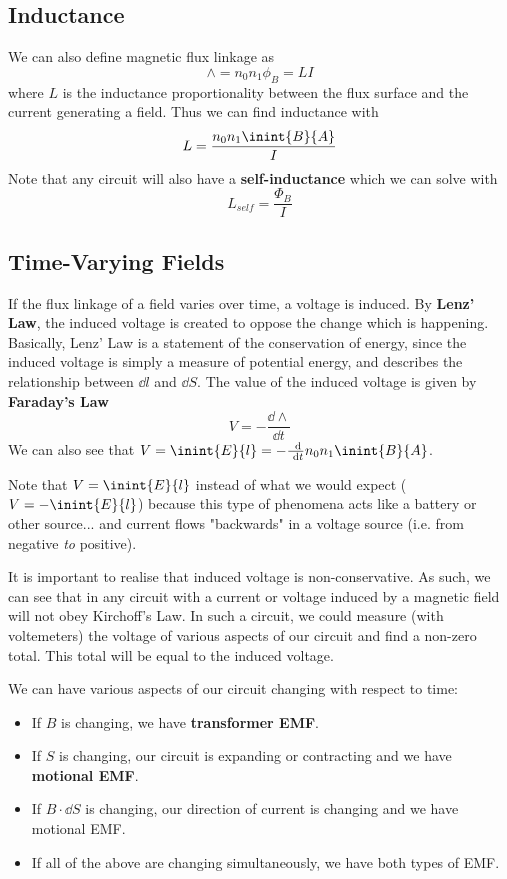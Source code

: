 \documentclass[12pt]{article}
\begin{document}
\subsection*{Inductance}
We can also define magnetic flux linkage as \[ \land = n_0n_1\phi_B = LI \] where $L$ is the inductance proportionality between the flux surface and the current generating a field. Thus we can find inductance with \[ L = \frac{n_0n_1 \inint{B}{A}}{I} \] Note that any circuit will also have a {\bf self-inductance} which we can solve with \[ L_{self} = \frac{\Phi_B}{I} \]

\subsection*{Time-Varying Fields}
If the flux linkage of a field varies over time, a voltage is induced. By {\bf Lenz' Law}, the induced voltage is created to oppose the change which is happening. Basically, Lenz' Law is a statement of the conservation of energy, since the induced voltage is simply a measure of potential energy, and describes the relationship between $\dd l$ and $\dd S$. The value of the induced voltage is given by {\bf Faraday's Law} \[ V = -\frac{\dd \land}{\dd t} \] We can also see that $V = \inint{E}{l} = -\frac{\dd}{\dd t} n_0n_1 \inint{B}{A}$.

Note that $V = \inint{E}{l}$ instead of what we would expect ($V = -\inint{E}{l}$) because this type of phenomena acts like a battery or other source... and current flows "backwards" in a voltage source (i.e. from negative \emph{to} positive).

It is important to realise that induced voltage is non-conservative. As such, we can see that in any circuit with a current or voltage induced by a magnetic field will not obey Kirchoff's Law. In such a circuit, we could measure (with voltemeters) the voltage of various aspects of our circuit and find a non-zero total. This total will be equal to the induced voltage.

We can have various aspects of our circuit changing with respect to time:
\begin{itemize}
\item If $B$ is changing, we have {\bf transformer EMF}.
\item If $S$ is changing, our circuit is expanding or contracting and we have {\bf motional EMF}.
\item If $B \cdot \dd S$ is changing, our direction of current is changing and we have motional EMF.
\item If all of the above are changing simultaneously, we have both types of EMF.
\end{itemize}
\end{document}
